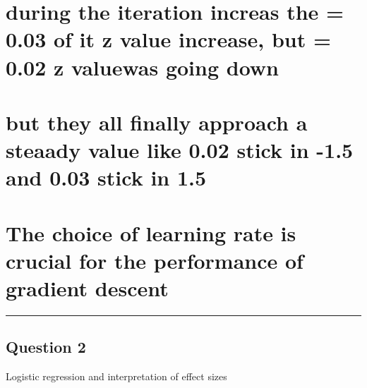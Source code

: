 \documentclass[
  letterpaper,
  DIV=11,
  numbers=noendperiod]{scrartcl}
\begin{document}
\hypertarget{during-the-iteration-increas-the-0.03-of-it-z-value-increase-but-0.02-z-valuewas-going-down}{%
\section{\texorpdfstring{during the iteration increas the \eta = 0.03 of
it z value increase, but \eta = 0.02 z valuewas going
down}{during the iteration increas the = 0.03 of it z value increase, but = 0.02 z valuewas going down}}\label{during-the-iteration-increas-the-0.03-of-it-z-value-increase-but-0.02-z-valuewas-going-down}}

\hypertarget{but-they-all-finally-approach-a-steaady-value-like-0.02-stick-in--1.5-and-0.03-stick-in-1.5}{%
\section{but they all finally approach a steaady value like 0.02 stick
in -1.5 and 0.03 stick in
1.5}\label{but-they-all-finally-approach-a-steaady-value-like-0.02-stick-in--1.5-and-0.03-stick-in-1.5}}

\hypertarget{the-choice-of-learning-rate-is-crucial-for-the-performance-of-gradient-descent}{%
\section{The choice of learning rate is crucial for the performance of
gradient
descent}\label{the-choice-of-learning-rate-is-crucial-for-the-performance-of-gradient-descent}}

\begin{center}\rule{0.5\linewidth}{0.5pt}\end{center}

\hypertarget{question-2}{%
\subsection{Question 2}\label{question-2}}

\begin{tcolorbox}[enhanced jigsaw, breakable, opacitybacktitle=0.6, colbacktitle=quarto-callout-tip-color!10!white, colframe=quarto-callout-tip-color-frame, rightrule=.15mm, toptitle=1mm, left=2mm, titlerule=0mm, coltitle=black, opacityback=0, leftrule=.75mm, bottomtitle=1mm, arc=.35mm, toprule=.15mm, bottomrule=.15mm, title=\textcolor{quarto-callout-tip-color}{\faLightbulb}\hspace{0.5em}{50 points}, colback=white]

Logistic regression and interpretation of effect sizes

\end{tcolorbox}
\end{document}
